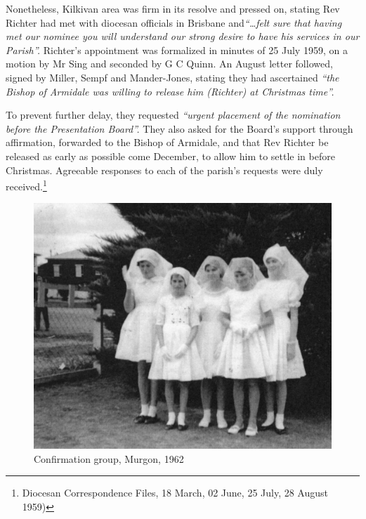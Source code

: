 Nonetheless, Kilkivan area was firm in its resolve and pressed on, stating Rev Richter had met with diocesan officials in Brisbane and\emph{``\ldots felt sure that having met our nominee you will understand our strong desire to have his services in our Parish''.} Richter's appointment was formalized in minutes of 25 July 1959, on a motion by Mr Sing and seconded by G C Quinn. An August letter followed, signed by Miller, Sempf and Mander-Jones, stating they had ascertained \emph{``the Bishop of Armidale was willing to release him (Richter) at Christmas time''.}



To prevent further delay, they requested \emph{``urgent placement of the nomination before the Presentation Board''.} They also asked for the Board's support through affirmation, forwarded to the Bishop of Armidale, and that Rev Richter be released as early as possible come December, to allow him to settle in before Christmas. Agreeable responses to each of the parish's requests were duly received.\footnote{Diocesan Correspondence Files, 18 March, 02 June, 25 July, 28 August 1959)}








\begin{figure}
\begin{center}
\includegraphics[width=1.\linewidth,center]{../images/confirmation1962.jpg}
\caption{Confirmation group, Murgon, 1962}
\end{center}
\end{figure}





